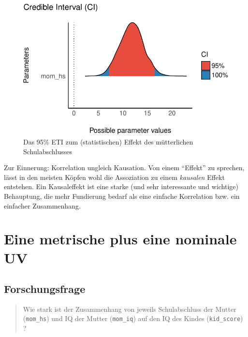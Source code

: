 \documentclass[
  a4paper,
  DIV=11]{scrreprt}
\theoremstyle{definition}
\theoremstyle{remark}
\begin{document}
\begin{figure}[H]

{\centering \includegraphics{./metrische-AV_files/figure-pdf/fig-m101hdi-1.pdf}

}

\caption{\label{fig-m101hdi}Das 95\% ETI zum (statistischen) Effekt des
mütterlichen Schulabschlusses}

\end{figure}

Zur Einnerung: Korrelation ungleich Kausation. Von einem ``Effekt'' zu
sprechen, lässt in den meisten Köpfen wohl die Assoziation zu einem
\emph{kausalen} Effekt entstehen. Ein Kausaleffekt ist eine starke (und
sehr interessante und wichtige) Behauptung, die mehr Fundierung bedarf
als eine einfache Korrelation bzw. ein einfacher Zusammenhang.

\hypertarget{eine-metrische-plus-eine-nominale-uv}{%
\section{Eine metrische plus eine nominale
UV}\label{eine-metrische-plus-eine-nominale-uv}}

\hypertarget{forschungsfrage-1}{%
\subsection{Forschungsfrage}\label{forschungsfrage-1}}

\begin{quote}
Wie stark ist der Zusammenhang von jeweils Schulabschluss der Mutter
(\texttt{mom\_hs}) und IQ der Mutter (\texttt{mom\_iq}) auf den IQ des
Kindes (\texttt{kid\_score}) ?
\end{quote}
\end{document}
